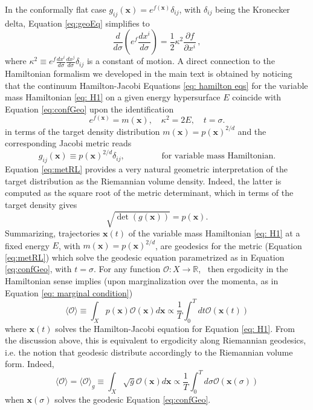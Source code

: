 \documentclass[twoside,11pt]{article}
\begin{document}
In the conformally flat case $g_{i j} (\mathbf{x}) = e^{f
(\mathbf{x})} \delta_{i j}$, with $\delta_{i j}$ being the Kronecker delta, Equation \eqref{eq:geoEq} simplifies to
\begin{equation}
  \frac{d}{d \sigma} \left( e^f  \frac{d x^i}{d \sigma} \right) = \frac{1}{2}
  \kappa^2 \frac{\partial f}{\partial x^i} \,, \label{eq:confGeo}
\end{equation}
where $\kappa^2 \equiv e^f \frac{d x^i}{d \sigma} \frac{d x^j}{d \sigma}
\delta_{i j}$ is a constant of motion. A direct connection to the Hamiltonian
formalism we developed in the main text is obtained by noticing that the
continuum Hamilton-Jacobi Equations \eqref{eq: hamilton eqs} for the variable mass Hamiltonian \eqref{eq: H1} on a given energy hypersurface $E$ coincide with Equation
\eqref{eq:confGeo} upon the identification
\begin{equation}
  e^{f (\mathbf{x})} = m (\mathbf{x}), \quad \kappa^2 = 2 E ,\quad t = \sigma.
\end{equation}
in terms of the target density distribution  $m
(\mathbf{x}) = p (\mathbf{x})^{2 / d}$ and the corresponding Jacobi metric
reads
\begin{equation}\label{eq:metRL}
  g_{i j} (\mathbf{x}) \equiv p (\mathbf{x})^{2 / d} \delta_{i j},
  \hspace{4em} \text{ for variable mass Hamiltonian.} 
\end{equation}
Equation \eqref{eq:metRL} provides a very natural geometric interpretation of
the target distribution as the Riemannian volume density. Indeed, the latter
is computed as the square root of the metric determinant, which in terms
of the target density gives
\begin{equation}
  \sqrt{\det (g (\mathbf{x}))} = p (\mathbf{x}) .
\end{equation}
Summarizing, trajectories $\mathbf{x} (t)$ of the variable mass Hamiltonian \eqref{eq: H1} at a
fixed energy $E$, with $m (\mathbf{x}) = p (\mathbf{x})^{2 / d}$, are
geodesics for the metric (Equation \eqref{eq:metRL}) which solve the geodesic equation
parametrized as in Equation \eqref{eq:confGeo}, with $t = \sigma$. For any function
$\mathcal{O} : X \rightarrow \mathbb{R}$, \ then ergodicity in the Hamiltonian
sense implies (upon marginalization over the momenta, as in Equation \eqref{eq: marginal condition})
\begin{equation}
  \langle \mathcal{O} \rangle \equiv \int_X p (\mathbf{x})  \mathcal{O}
  (\mathbf{x}) d \mathbf{x} \propto \frac{1}{T} \int_0^T d t \mathcal{O}
  (\mathbf{x} (t))
\end{equation}
where $\mathbf{x} (t)$ solves the Hamilton-Jacobi equation for Equation \eqref{eq: H1}. From the
discussion above,  this is equivalent to ergodicity along Riemannian
geodesics, i.e. the notion that geodesic distribute accordingly to the Riemannian
volume form. Indeed,
\begin{equation}
  \langle \mathcal{O} \rangle = \langle \mathcal{O} \rangle_g \equiv \int_X
  \sqrt{g}  \mathcal{O} (\mathbf{x}) d \mathbf{x} \propto \frac{1}{T}
  \int_0^T d \sigma \mathcal{O} (\mathbf{x} (\sigma))
\end{equation}
when $\mathbf{x} (\sigma)$ solves the geodesic Equation \eqref{eq:confGeo}.
\end{document}
